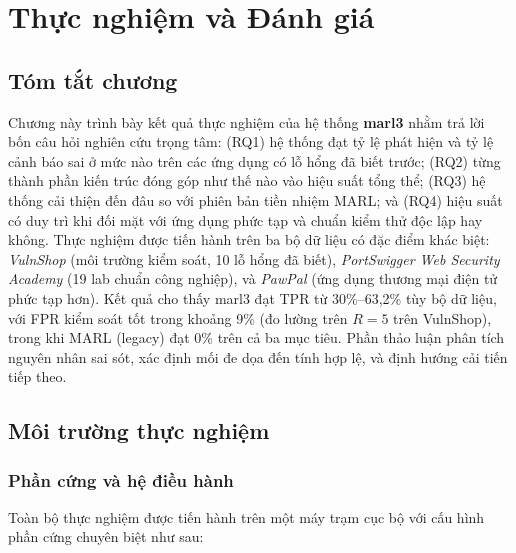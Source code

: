 
\chapter{Thực nghiệm và Đánh giá}

\label{Chapter4}

\section*{Tóm tắt chương}
Chương này trình bày kết quả thực nghiệm của hệ thống \textbf{marl3} nhằm trả lời bốn câu hỏi nghiên cứu trọng tâm: (RQ1) hệ thống đạt tỷ lệ phát hiện và tỷ lệ cảnh báo sai ở mức nào trên các ứng dụng có lỗ hổng đã biết trước; (RQ2) từng thành phần kiến trúc đóng góp như thế nào vào hiệu suất tổng thể; (RQ3) hệ thống cải thiện đến đâu so với phiên bản tiền nhiệm MARL; và (RQ4) hiệu suất có duy trì khi đối mặt với ứng dụng phức tạp và chuẩn kiểm thử độc lập hay không. Thực nghiệm được tiến hành trên ba bộ dữ liệu có đặc điểm khác biệt: \textit{VulnShop} (môi trường kiểm soát, 10 lỗ hổng đã biết), \textit{PortSwigger Web Security Academy} (19 lab chuẩn công nghiệp), và \textit{PawPal} (ứng dụng thương mại điện tử phức tạp hơn). Kết quả cho thấy marl3 đạt TPR từ 30\%--63,2\% tùy bộ dữ liệu, với FPR kiểm soát tốt trong khoảng 9\% (đo lường trên $R=5$ trên VulnShop), trong khi MARL (legacy) đạt 0\% trên cả ba mục tiêu. Phần thảo luận phân tích nguyên nhân sai sót, xác định mối đe dọa đến tính hợp lệ, và định hướng cải tiến tiếp theo.

\section{Môi trường thực nghiệm}
\label{sec:env}

\subsection{Phần cứng và hệ điều hành}

Toàn bộ thực nghiệm được tiến hành trên một máy trạm cục bộ với cấu hình phần cứng chuyên biệt như sau:

